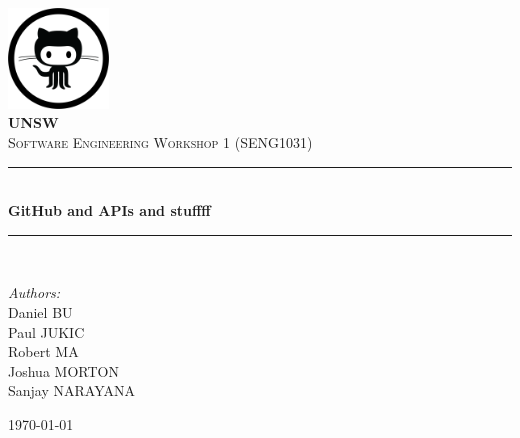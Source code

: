 \documentclass[12pt]{article}
\newcommand{\HRule}{\rule{\linewidth}{0.5mm}}
\begin{document}
\begin{center}
\includegraphics[width=0.2\textwidth]{github_icon}~\\[1cm]

\textsc{\LARGE \textbf{UNSW}}\\[1.5cm]

\textsc{\Large Software Engineering Workshop 1 (SENG1031)}\\[0.5cm]

\HRule \\[0.4cm]
{ \huge \bfseries GitHub and APIs and stuffff \\[0.4cm] }

\HRule \\[1.5cm]

\begin{minipage}{0.4\textwidth}
\begin{flushleft} \large
\emph{Authors:}\\
Daniel \textsc{BU}\\
Paul \textsc{JUKIC}\\
Robert \textsc{MA}\\
Joshua \textsc{MORTON}\\
Sanjay \textsc{NARAYANA}
\end{flushleft}
\end{minipage}
\begin{minipage}{0.4\textwidth}
\begin{flushright} \large
\end{flushright}
\end{minipage}

\vfill

{\large \today}
\end{center}

\pagebreak
\end{document}
